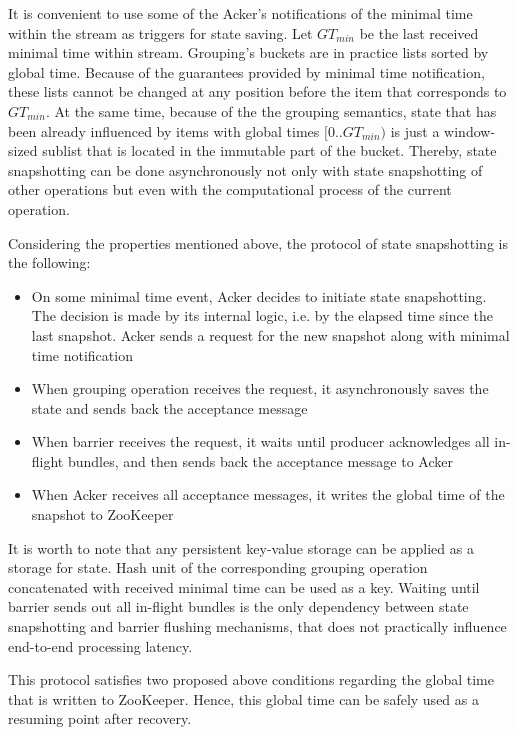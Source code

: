 It is convenient to use some of the Acker's notifications of the minimal time within the stream as triggers for state saving. Let $GT_{min}$ be the last received minimal time within stream. Grouping's buckets are in practice lists sorted by global time. Because of the guarantees provided by minimal time notification, these lists cannot be changed at any position before the item that corresponds to $GT_{min}$. At the same time, because of the the grouping semantics, state that has been already influenced by items with global times $[0..GT_{min})$ is just a window-sized sublist that is located in the immutable part of the bucket. Thereby, state snapshotting can be done asynchronously not only with state snapshotting of other operations but even with the computational process of the current operation.

Considering the properties mentioned above, the protocol of state snapshotting is the following:

\begin{itemize}
    \item On some minimal time event, Acker decides to initiate state snapshotting. The decision is made by its internal logic, i.e. by the elapsed time since the last snapshot. Acker sends a request for the new snapshot along with minimal time notification
    \item When grouping operation receives the request, it asynchronously saves the state and sends back the acceptance message   
    \item When barrier receives the request, it waits until producer acknowledges all in-flight bundles, and then sends back the acceptance message to Acker
    \item When Acker receives all acceptance messages, it writes the global time of the snapshot to ZooKeeper 
\end{itemize}

It is worth to note that any persistent key-value storage can be applied as a storage for state. Hash unit of the corresponding grouping operation concatenated with received minimal time can be used as a key. Waiting until barrier sends out all in-flight bundles is the only dependency between state snapshotting and barrier flushing mechanisms, that does not practically influence end-to-end processing latency. 

This protocol satisfies two proposed above conditions regarding the global time that is written to ZooKeeper. Hence, this global time can be safely used as a resuming point after recovery.

